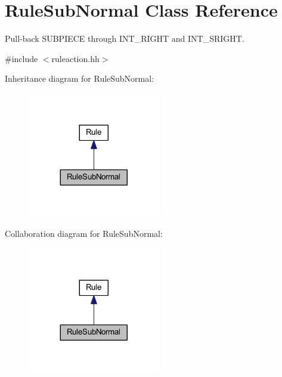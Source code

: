 \hypertarget{class_rule_sub_normal}{}\section{Rule\+Sub\+Normal Class Reference}
\label{class_rule_sub_normal}


Pull-\/back S\+U\+B\+P\+I\+E\+CE through I\+N\+T\+\_\+\+R\+I\+G\+HT and I\+N\+T\+\_\+\+S\+R\+I\+G\+HT.  




{\ttfamily \#include $<$ruleaction.\+hh$>$}



Inheritance diagram for Rule\+Sub\+Normal\+:
\nopagebreak
\begin{figure}[H]
\begin{center}
\leavevmode
\includegraphics[width=164pt]{class_rule_sub_normal__inherit__graph}
\end{center}
\end{figure}


Collaboration diagram for Rule\+Sub\+Normal\+:
\nopagebreak
\begin{figure}[H]
\begin{center}
\leavevmode
\includegraphics[width=164pt]{class_rule_sub_normal__coll__graph}
\end{center}
\end{figure}
